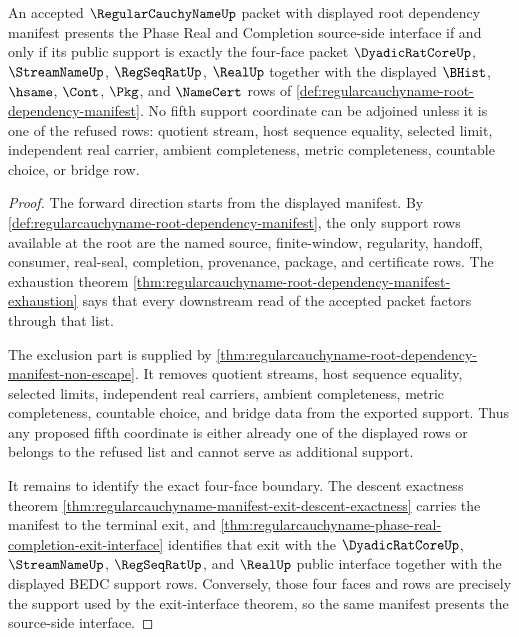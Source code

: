 \begin{theorem}
\label{thm:regularcauchyname-four-face-support-minimality}
An accepted $\RegularCauchyNameUp$ packet with displayed root dependency manifest presents the Phase Real and Completion source-side interface if and only if its public support is exactly the four-face packet $\DyadicRatCoreUp$, $\StreamNameUp$, $\RegSeqRatUp$, $\RealUp$ together with the displayed $\BHist$, $\hsame$, $\Cont$, $\Pkg$, and $\NameCert$ rows of \autoref{def:regularcauchyname-root-dependency-manifest}. No fifth support coordinate can be adjoined unless it is one of the refused rows: quotient stream, host sequence equality, selected limit, independent real carrier, ambient completeness, metric completeness, countable choice, or bridge row.
\end{theorem}
\begin{proof}
The forward direction starts from the displayed manifest. By \autoref{def:regularcauchyname-root-dependency-manifest}, the only support rows available at the root are the named source, finite-window, regularity, handoff, consumer, real-seal, completion, provenance, package, and certificate rows. The exhaustion theorem \autoref{thm:regularcauchyname-root-dependency-manifest-exhaustion} says that every downstream read of the accepted packet factors through that list.

The exclusion part is supplied by \autoref{thm:regularcauchyname-root-dependency-manifest-non-escape}. It removes quotient streams, host sequence equality, selected limits, independent real carriers, ambient completeness, metric completeness, countable choice, and bridge data from the exported support. Thus any proposed fifth coordinate is either already one of the displayed rows or belongs to the refused list and cannot serve as additional support.

It remains to identify the exact four-face boundary. The descent exactness theorem \autoref{thm:regularcauchyname-manifest-exit-descent-exactness} carries the manifest to the terminal exit, and \autoref{thm:regularcauchyname-phase-real-completion-exit-interface} identifies that exit with the $\DyadicRatCoreUp$, $\StreamNameUp$, $\RegSeqRatUp$, and $\RealUp$ public interface together with the displayed BEDC support rows. Conversely, those four faces and rows are precisely the support used by the exit-interface theorem, so the same manifest presents the source-side interface.
\end{proof}

